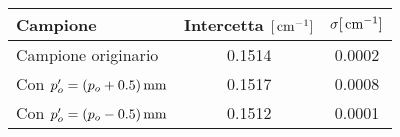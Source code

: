 \begin{tabulary}{\textwidth}{LCC}
\toprule
Campione & Intercetta $[\,\mathrm{cm}^{-1}]$  & $\sigma [\,\mathrm{cm}^{-1}]$\\ \midrule
Campione originario & 0.1514 & 0.0002\\
Con $p_{o}'=(p_o+0.5)\,\mathrm{mm}$ & 0.1517 & 0.0008\\
Con $p_{o}'=(p_o-0.5)\,\mathrm{mm}$ & 0.1512 & 0.0001\\
\bottomrule
\end{tabulary}

